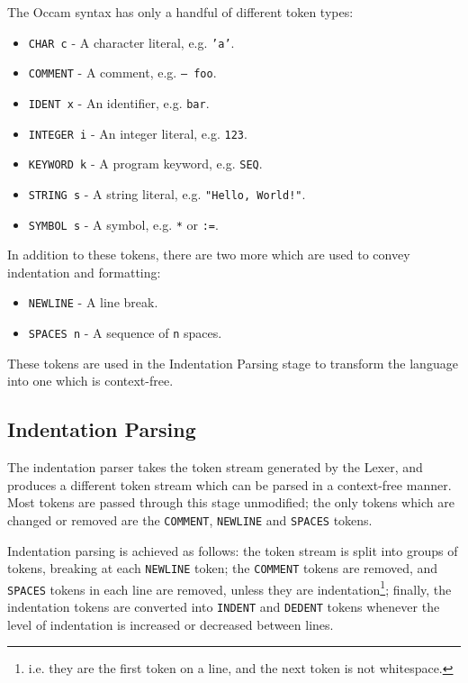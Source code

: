 The Occam syntax has only a handful of different token types:
\begin{itemize}
  \item \texttt{CHAR c} - A character literal, e.g. \texttt{'a'}.
  \item \texttt{COMMENT} - A comment, e.g. \texttt{-- foo}.
  \item \texttt{IDENT x} - An identifier, e.g. \texttt{bar}.
  \item \texttt{INTEGER i} - An integer literal, e.g. \texttt{123}.
  \item \texttt{KEYWORD k} - A program keyword, e.g. \texttt{SEQ}.
  \item \texttt{STRING s} - A string literal, e.g. \texttt{"Hello, World!"}.
  \item \texttt{SYMBOL s} - A symbol, e.g. \texttt{*} or \texttt{:=}.
\end{itemize}
In addition to these tokens, there are two more which are used to convey
indentation and formatting:
\begin{itemize}
  \item \texttt{NEWLINE} - A line break.
  \item \texttt{SPACES n} - A sequence of \texttt{n} spaces.
\end{itemize}
These tokens are used in the Indentation Parsing stage to transform the language
into one which is context-free.

\subsection{Indentation Parsing}

The indentation parser takes the token stream generated by the Lexer, and
produces a different token stream which can be parsed in a context-free manner.
Most tokens are passed through this stage unmodified; the only tokens which are
changed or removed are the \texttt{COMMENT}, \texttt{NEWLINE} and
\texttt{SPACES} tokens.

Indentation parsing is achieved as follows: the token stream is split into
groups of tokens, breaking at each \texttt{NEWLINE} token; the \texttt{COMMENT}
tokens are removed, and \texttt{SPACES} tokens in each line are removed, unless
they are indentation\footnote{i.e. they are the first token on a line, and the
next token is not whitespace.}; finally, the indentation tokens are converted
into \texttt{INDENT} and \texttt{DEDENT} tokens whenever the level of
indentation is increased or decreased between lines.

